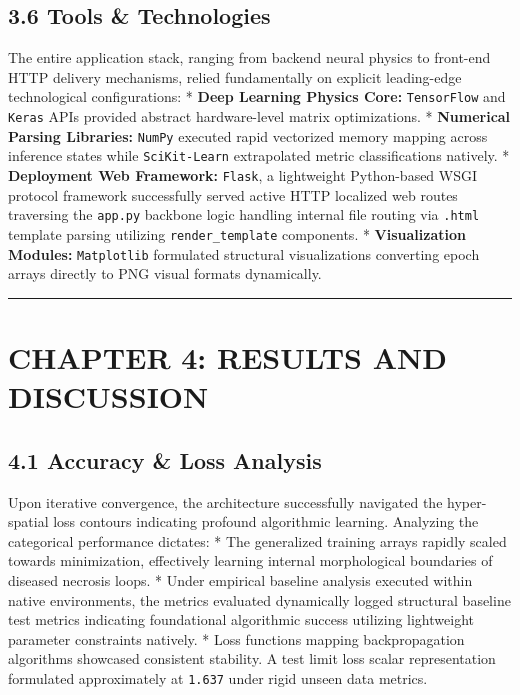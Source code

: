 \documentclass[
]{article}
\begin{document}
\subsection{3.6 Tools \& Technologies}\label{tools-technologies}

The entire application stack, ranging from backend neural physics to
front-end HTTP delivery mechanisms, relied fundamentally on explicit
leading-edge technological configurations: * \textbf{Deep Learning
Physics Core:} \texttt{TensorFlow} and \texttt{Keras} APIs provided
abstract hardware-level matrix optimizations. * \textbf{Numerical
Parsing Libraries:} \texttt{NumPy} executed rapid vectorized memory
mapping across inference states while \texttt{SciKit-Learn} extrapolated
metric classifications natively. * \textbf{Deployment Web Framework:}
\texttt{Flask}, a lightweight Python-based WSGI protocol framework
successfully served active HTTP localized web routes traversing the
\texttt{app.py} backbone logic handling internal file routing via
\texttt{.html} template parsing utilizing \texttt{render\_template}
components. * \textbf{Visualization Modules:} \texttt{Matplotlib}
formulated structural visualizations converting epoch arrays directly to
PNG visual formats dynamically.

\begin{center}\rule{0.5\linewidth}{0.5pt}\end{center}

\section{CHAPTER 4: RESULTS AND
DISCUSSION}\label{chapter-4-results-and-discussion}

\subsection{4.1 Accuracy \& Loss Analysis}\label{accuracy-loss-analysis}

Upon iterative convergence, the architecture successfully navigated the
hyper-spatial loss contours indicating profound algorithmic learning.
Analyzing the categorical performance dictates: * The generalized
training arrays rapidly scaled towards minimization, effectively
learning internal morphological boundaries of diseased necrosis loops. *
Under empirical baseline analysis executed within native environments,
the metrics evaluated dynamically logged structural baseline test
metrics indicating foundational algorithmic success utilizing
lightweight parameter constraints natively. * Loss functions mapping
backpropagation algorithms showcased consistent stability. A test limit
loss scalar representation formulated approximately at \texttt{1.637}
under rigid unseen data metrics.
\end{document}
